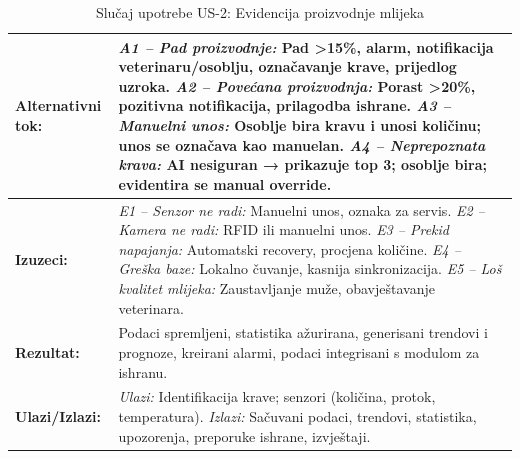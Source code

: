 \documentclass{article}
\begin{document}
\begin{table}[H]
\begin{tabular}{|p{3.5cm}|p{11cm}|}
\hline
\textbf{Alternativni tok:} & 
\textit{A1 – Pad proizvodnje:} Pad >15\%, alarm, notifikacija veterinaru/osoblju, označavanje krave, prijedlog uzroka. \newline
\textit{A2 – Povećana proizvodnja:} Porast >20\%, pozitivna notifikacija, prilagodba ishrane. \newline
\textit{A3 – Manuelni unos:} Osoblje bira kravu i unosi količinu; unos se označava kao manuelan. \newline
\textit{A4 – Neprepoznata krava:} AI nesiguran → prikazuje top 3; osoblje bira; evidentira se manual override. \\
\hline
\textbf{Izuzeci:} & 
\textit{E1 – Senzor ne radi:} Manuelni unos, oznaka za servis. \newline
\textit{E2 – Kamera ne radi:} RFID ili manuelni unos. \newline
\textit{E3 – Prekid napajanja:} Automatski recovery, procjena količine. \newline
\textit{E4 – Greška baze:} Lokalno čuvanje, kasnija sinkronizacija. \newline
\textit{E5 – Loš kvalitet mlijeka:} Zaustavljanje muže, obavještavanje veterinara. \\
\hline
\textbf{Rezultat:} & Podaci spremljeni, statistika ažurirana, generisani trendovi i prognoze, kreirani alarmi, podaci integrisani s modulom za ishranu. \\
\hline
\textbf{Ulazi/Izlazi:} & 
\textit{Ulazi:} Identifikacija krave; senzori (količina, protok, temperatura). \newline
\textit{Izlazi:} Sačuvani podaci, trendovi, statistika, upozorenja, preporuke ishrane, izvještaji. \\
\hline
\end{tabular}
\caption{Slučaj upotrebe US-2: Evidencija proizvodnje mlijeka}
\end{table}


\pagebreak
\end{document}

